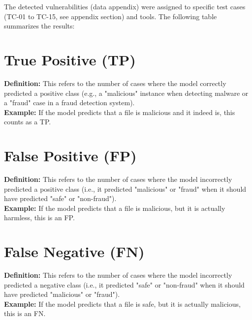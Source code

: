 \documentclass[conference]{IEEEtran}
\begin{document}
The detected vulnerabilities (data appendix) were assigned to specific test cases (TC-01 to TC-15, see appendix section) and tools. The following table summarizes the results:

\begin{table}[h]
    \centering
    \caption{Summary of Test Case Results}
    \label{tab:testcase-results}
\end{table}

\section*{True Positive (TP)}
\textbf{Definition:} This refers to the number of cases where the model correctly predicted a positive class (e.g., a "malicious" instance when detecting malware or a "fraud" case in a fraud detection system).\\
\textbf{Example:} If the model predicts that a file is malicious and it indeed is, this counts as a TP.

\section*{False Positive (FP)}
\textbf{Definition:} This refers to the number of cases where the model incorrectly predicted a positive class (i.e., it predicted "malicious" or "fraud" when it should have predicted "safe" or "non-fraud").\\
\textbf{Example:} If the model predicts that a file is malicious, but it is actually harmless, this is an FP.

\section*{False Negative (FN)}
\textbf{Definition:} This refers to the number of cases where the model incorrectly predicted a negative class (i.e., it predicted "safe" or "non-fraud" when it should have predicted "malicious" or "fraud").\\
\textbf{Example:} If the model predicts that a file is safe, but it is actually malicious, this is an FN.
\end{document}
